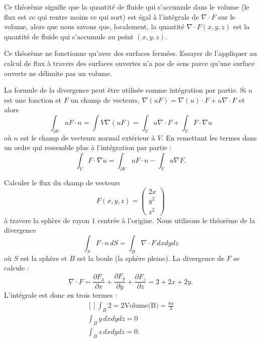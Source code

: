 Ce théorème signifie que la quantité de fluide qui s'accumule dans le volume (le flux est ce qui rentre moins ce qui sort) est égal à l'intégrale de $\nabla\cdot F$ sur le volume, alors que nous savons que, localement, la quantité $\nabla\cdot F(x,y,z)$ est la quantité de fluide qui s'accumule au point $(x,y,z)$.

\begin{remark}
    Ce théorème ne fonctionne qu'avec des surfaces fermées. Essayer de l'appliquer au calcul de flux à travers des surfaces ouvertes n'a pas de sens parce qu'une surface ouverte ne délimite pas un volume.
\end{remark}

\begin{normaltext}
    La formule de la divergence peut être utilisée comme intégration par partie. Si \( u\) est une fonction et \( F\) un champ de vecteurs, \( \nabla(uF)=\nabla(u)\cdot F+u\nabla\cdot F\) et alors
    \begin{equation}
        \int_{\partial V}uF\cdot n=\int V\nabla(uF)=\int_Vu\nabla\cdot F+\int_VF\cdot \nabla u
    \end{equation}
    où \( n\) est le champ de vecteurs normal extérieur à \( V\). En remettant les termes dans un ordre qui ressemble plus à l'intégration par partie :
    \begin{equation}        \label{EQooRUCKooUUrgxI}
        \int_{V}F\cdot \nabla u=\int_{\partial V}uF\cdot n-\int_Vu\nabla F.
    \end{equation}
\end{normaltext}

\begin{example}
    Calculer le flux du champ de vecteurs
    \begin{equation}
        F(x,y,z)=\begin{pmatrix}
            2x    \\ 
            y^2    \\ 
            z^2    
        \end{pmatrix}
    \end{equation}
    à travers la sphère de rayon $1$ centrée à l'origine. Nous utilisons le théorème de la divergence
    \begin{equation}
        \int_S F\cdot n\,dS=\int_B\nabla \cdot F\,dxdydz
    \end{equation}
    où $S$ est la sphère et $B$ est la boule (la sphère pleine). La divergence de $F$ se calcule :
    \begin{equation}
        \nabla\cdot F=\frac{ \partial F_x }{ \partial x }+\frac{ \partial F_y }{ \partial y }+\frac{ \partial F_z }{ \partial z }=2+2x+2y.
    \end{equation}
    L'intégrale est donc en trois termes :
    \begin{equation}
        \begin{aligned}[]
            \int_B2=2\text{Volume(B)}=\frac{ 8\pi }{ 3 }\\
            \int_By\,dxdydz=0\\
            \int_Bz\,dxdydz=0.
        \end{aligned}
    \end{equation}
\end{example}

